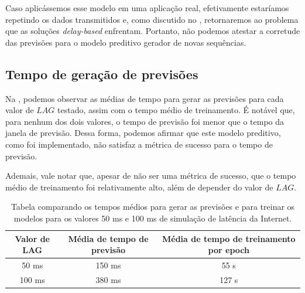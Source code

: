 Caso aplicássemos esse modelo em uma aplicação real, efetivamente estaríamos repetindo os dados transmitidos e, como discutido no , retornaremos ao problema que as soluções \textit{delay-based} enfrentam. Portanto, não podemos atestar a corretude das previsões para o modelo preditivo gerador de novas sequências.

\subsection{Tempo de geração de previsões}

Na , podemos observar as médias de tempo para gerar as previsões para cada valor de $LAG$ testado, assim com o tempo médio de treinamento. É notável que, para nenhum dos dois valores, o tempo de previsão foi menor que o tempo da janela de previsão. Dessa forma, podemos afirmar que este modelo preditivo, como foi implementado, não satisfaz a métrica de sucesso para o tempo de previsão.

Ademais, vale notar que, apesar de não ser uma métrica de sucesso, que o tempo médio de treinamento foi relativamente alto, além de depender do valor de $LAG$.

\begin{table}[ht!]
    \centering
    \begin{tabular}{|c||c|c|}
        \hline
        
        Valor de LAG & Média de tempo de previsão & Média de tempo de treinamento por epoch \\
        
        \hline
        \hline
        
        50 ms & 150 ms & 55 s  \\ 
        \hline
        
        100 ms & 380 ms & 127 s \\ 
        \hline
    \end{tabular}
    \caption{Tabela comparando os tempos médios para gerar as previsões e para treinar os modelos para os valores 50 ms e 100 ms de simulação de latência da Internet.}
    \label{tab:lstm-time-results}
\end{table}
